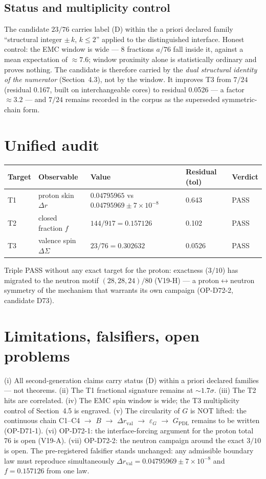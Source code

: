 \documentclass[11pt,a4paper]{article}
\begin{document}
\subsection{Status and multiplicity control}
The candidate $23/76$ carries label (D) within the a priori declared family ``structural integer $\pm\, k$, $k \le 2$'' applied to the distinguished interface. Honest control: the EMC window is wide --- 8 fractions $a/76$ fall inside it, against a mean expectation of $\approx 7.6$; window proximity alone is statistically ordinary and proves nothing. The candidate is therefore carried by the \emph{dual structural identity of the numerator} (Section~4.3), not by the window. It improves T3 from $7/24$ (residual 0.167, built on interchangeable cores) to residual 0.0526 --- a factor $\approx 3.2$ --- and $7/24$ remains recorded in the corpus as the superseded symmetric-chain form.

\section{Unified audit}
\begin{table}[h]
\centering
\begin{tabular}{lllll}
\toprule
Target & Observable & Value & Residual (tol) & Verdict \\
\midrule
T1 & proton skin $\Delta r$ & $0.04795965$ vs $0.04795969 \pm 7\times 10^{-8}$ & 0.643 & PASS \\
T2 & closed fraction $f$ & $144/917 = 0.157126$ & 0.102 & PASS \\
T3 & valence spin $\Delta\Sigma$ & $23/76 = 0.302632$ & 0.0526 & PASS \\
\bottomrule
\end{tabular}
\end{table}

Triple PASS without any exact target for the proton: exactness ($3/10$) has migrated to the neutron motif $(28,28,24)/80$ (V19-H) --- a proton$\leftrightarrow$neutron symmetry of the mechanism that warrants its own campaign (OP-D72-2, candidate D73).

\section{Limitations, falsifiers, open problems}\label{sec:limits}
(i) All second-generation claims carry status (D) within a priori declared families --- not theorems. (ii) The T1 fractional signature remains at $\sim 1.7\sigma$. (iii) The T2 hits are correlated. (iv) The EMC spin window is wide; the T3 multiplicity control of Section~4.5 is engraved. (v) The circularity of $G$ is NOT lifted: the continuous chain C1--C4 $\to$ $B$ $\to$ $\Delta r_{\mathrm{val}}$ $\to$ $\varepsilon_G$ $\to$ $G_{\mathrm{PDL}}$ remains to be written (OP-D71-1). (vi) OP-D72-1: the interface-forcing argument for the proton total 76 is open (V19-A). (vii) OP-D72-2: the neutron campaign around the exact $3/10$ is open. The pre-registered falsifier stands unchanged: any admissible boundary law must reproduce simultaneously $\Delta r_{\mathrm{val}} = 0.04795969 \pm 7 \times 10^{-8}$ and $f = 0.157126$ from one law.
\end{document}
